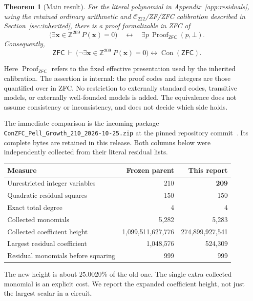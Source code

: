 \documentclass[11pt]{article}
\newtheorem{theorem}{Theorem}[section]
\theoremstyle{definition}
\theoremstyle{remark}
\newcommand{\Z}{\mathbb Z}
\newcommand{\ZFC}{\mathsf{ZFC}}
\newcommand{\Con}{\operatorname{Con}}
\newcommand{\Ccal}{\mathcal C_{222}}
\begin{document}
\begin{theorem}[Main result]\label{thm:main}
For the literal polynomial in Appendix~\ref{app:residuals}, using the
retained ordinary arithmetic and $\Ccal$/ZF/ZFC calibration described in
Section~\ref{sec:inherited}, there is a proof formalizable in ZFC of
\[
 \bigl(\exists\boldsymbol x\in\Z^{209}\ P(\boldsymbol x)=0\bigr)
 \quad\longleftrightarrow\quad
 \exists p\,\operatorname{Proof}_{\ZFC}(p,\bot).
\]
Consequently,
\[
 \ZFC\ \vdash\
 \bigl(\neg\exists\boldsymbol x\in\Z^{209}\ P(\boldsymbol x)=0\bigr)
 \longleftrightarrow\Con(\ZFC).
\]
\end{theorem}

Here $\operatorname{Proof}_{\ZFC}$ refers to the fixed effective presentation
used by the inherited calibration. The assertion is internal: the proof
codes and integers are those quantified over in ZFC. No restriction to
externally standard codes, transitive models, or externally well-founded
models is added. The equivalence does not assume consistency or
inconsistency, and does not decide which side holds.

The immediate comparison is the incoming package
\texttt{ConZFC\_Pell\_Growth\_210\_2026-10-25.zip} at the pinned repository
commit~\cite{parent,repo}. Its complete bytes are retained in this release.
Both columns below were independently collected from their literal
residual lists.

\begin{center}
\begin{tabular}{lrr}
\toprule
Measure & Frozen parent & This report\\
\midrule
Unrestricted integer variables & 210 & \textbf{209}\\
Quadratic residual squares & 150 & 150\\
Exact total degree & 4 & 4\\
Collected monomials & 5,282 & 5,283\\
Collected coefficient height & 1,099,511,627,776 & 274,899,927,541\\
Largest residual coefficient & 1,048,576 & 524,309\\
Residual monomials before squaring & 999 & 999\\
\bottomrule
\end{tabular}
\end{center}

The new height is about $25.0020\%$ of the old one. The single extra
collected monomial is an explicit cost. We report the expanded coefficient
height, not just the largest scalar in a circuit.
\end{document}

